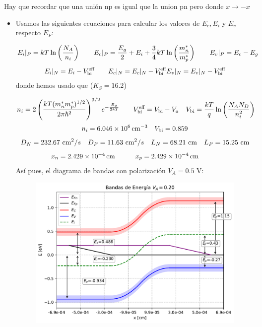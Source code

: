 Hay que recordar que una unión np es igual que la union pn pero donde $x\rightarrow -x$
\begin{itemize}
    \item Usamos las siguientes ecuaciones para calcular los valores de $E_c,E_i$ y $E_v$ respecto $E_F$: 
    
    \begin{equation*}
        E_i|_P =  k T \ln \left( \frac{N_A}{n_i} \right) \qquad E_c|_P = \frac{E_g}{2} + E_i + \frac{3}{4} kT \ln \left( \frac{m_n^*}{m_p^*} \right) \qquad E_v |_P = E_c - E_g
    \end{equation*}
    \begin{equation*}
        E_i|_N = E_i - V_{\text{bi}}^\text{eff}  \qquad E_c|_N = E_c|_N - V_{\text{bi}}^\text{eff} E_v |_N = E_v|_N - V_{\text{bi}}^\text{eff} 
    \end{equation*}
    donde hemos usado que ($K_S=16.2$)

    \begin{equation*}
        n_i = 2 \left( \frac{kT (m_n^* m_p^* )^{1/2}}{2\pi \hbar^2} \right)^{3/2} e^{-\frac{E_g}{2kT}} 
    \qquad V_{\text{bi}}^{\text{eff}} = V_{\text{bi}} - V_a \quad V_{\text{bi}} = \frac{kT}{q} \ln \left( \frac{N_AN_D}{n_i^2} \right)
    \end{equation*}
    \begin{equation}
        n_i=\SI{6.046e+6}{cm^{-3}} \quad V_{\text{bi}} = 0.859 
    \end{equation}
    \begin{equation}
        D_N = 232.67 \ \cm^2/s \quad D_P =  11.63 \ \cm^2/s \quad L_N = 68.21 \ \cm \quad L_P = 15.25 \ \cm
    \end{equation}
    \begin{equation}
        x_n = \SI{2.429e-4}{cm} \quad \quad \quad 
        x_p = \SI{2.429e-4}{cm} \quad \quad \quad 
    \end{equation}
    Así pues, el diagrama de bandas con polarización $V_A=0.5$ V: 

    \begin{figure}[h!] \centering
        \includegraphics[width=0.6\linewidth]{Cuerpo/Ch_03/03_06_01.pdf}
    \end{figure}
    


\end{itemize}
